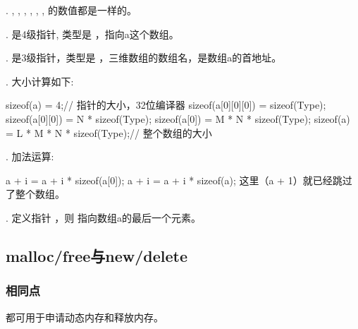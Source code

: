 \documentclass[letterpaper,10pt,english]{sphinxmanual}
\begin{document}
.  ,  ,  ,  ,  ,  ,  的数值都是一样的。

.  是4级指针, 类型是  ，指向a这个数组。

.  是3级指针，类型是  ，三维数组的数组名，是数组a的首地址。

. 大小计算如下:

%
\begin{sphinxVerbatim}[commandchars=\\\{\}]
sizeof(\PYGZam{}a) = 4;// 指针的大小，32位编译器
sizeof(a[0][0][0]) = sizeof(Type);
sizeof(a[0][0]) = N * sizeof(Type);
sizeof(a[0]) = M * N * sizeof(Type);
sizeof(a) = L * M * N * sizeof(Type);// 整个数组的大小
\end{sphinxVerbatim}

. 加法运算:

%
\begin{sphinxVerbatim}[commandchars=\\\{\}]
a + i = a + i * sizeof(a[0]);
\PYGZam{}a + i = a + i * sizeof(a);
这里（\PYGZam{}a + 1）就已经跳过了整个数组。
\end{sphinxVerbatim}

. 定义指针  ，则  指向数组a的最后一个元素。


\subsection{malloc/free与new/delete}
\label{\detokenize{cpp/02_array:malloc-freenew-delete}}

\subsubsection{相同点}
\label{\detokenize{cpp/02_array:id8}}
都可用于申请动态内存和释放内存。
\end{document}
